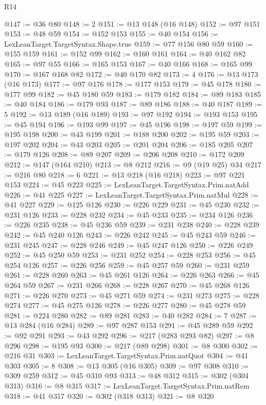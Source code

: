 \begin{lexlean}{R14}
\begin{coremodule}
@147 := @36 @80
@148 := 2
@151 := @13 @148 (@16 @148)
@152 := @97 @151
@153 := @48 @59
@154 := @152 @153
@155 := @40 @154
@156 := LexLeanTarget.TargetSyntax.Shape.true
@159 := @77 @156 @80 @59
@160 := @155 @159
@161 := @152 @99
@162 := @160 @161
@164 := @40 @162 @82
@165 := @97 @55
@166 := @165 @153
@167 := @40 @166
@168 := @165 @99
@170 := @167 @168 @82
@172 := @40 @170 @82
@173 := 4
@176 := @13 @173 (@16 @173)
@177 := @97 @176
@178 := @177 @153
@179 := @45 @178
@180 := @177 @99
@182 := @45 @180 @59
@183 := @179 @182
@184 := @89 @183
@185 := @40 @184
@186 := @179 @93
@187 := @89 @186
@188 := @40 @187
@189 := 5
@192 := @13 @189 (@16 @189)
@193 := @97 @192
@194 := @193 @153
@195 := @45 @194
@196 := @193 @99
@197 := @45 @196
@198 := @197 @59
@199 := @195 @198
@200 := @43 @199
@201 := @188 @200
@202 := @195 @59
@203 := @197 @202
@204 := @43 @203
@205 := @201 @204
@206 := @185 @205
@207 := @179 @126
@208 := @89 @207
@209 := @206 @208
@210 := @172 @209
@212 := @147 (@164 @210)
@213 := @8 @212
@216 := @9 (@19 @25) @34
@217 := @216 @80
@218 := 6
@221 := @13 @218 (@16 @218)
@223 := @97 @221 @153
@224 := @45 @223
@225 := LexLeanTarget.TargetSyntax.Prim.natAdd
@226 := @41 @225
@227 := LexLeanTarget.TargetSyntax.Prim.natMul
@228 := @41 @227
@229 := @125 @126
@230 := @226 @229
@231 := @45 @230
@232 := @231 @126
@233 := @228 @232
@234 := @45 @233
@235 := @234 @126
@236 := @226 @235
@238 := @45 @236 @59
@239 := @231 @238
@240 := @228 @239
@242 := @45 @240 @126
@243 := @226 @242
@245 := @45 @243 @59
@246 := @231 @245
@247 := @228 @246
@249 := @45 @247 @126
@250 := @226 @249
@252 := @45 @250 @59
@253 := @231 @252
@254 := @228 @253
@256 := @45 @254 @126
@257 := @226 @256
@259 := @45 @257 @59
@260 := @231 @259
@261 := @228 @260
@263 := @45 @261 @126
@264 := @226 @263
@266 := @45 @264 @59
@267 := @231 @266
@268 := @228 @267
@270 := @45 @268 @126
@271 := @226 @270
@273 := @45 @271 @59
@274 := @231 @273
@275 := @228 @274
@277 := @45 @275 @126
@278 := @226 @277
@280 := @45 @278 @59
@281 := @224 @280
@282 := @89 @281
@283 := @40 @282
@284 := 7
@287 := @13 @284 (@16 @284)
@289 := @97 @287 @153
@291 := @45 @289 @59
@292 := @92 @291
@293 := @43 @292
@296 := @217 (@283 @293 @82)
@297 := @8 @296
@298 := @195 @93
@300 := @217 (@89 @298)
@301 := @8 @300
@302 := @216 @31
@303 := LexLeanTarget.TargetSyntax.Prim.natQuot
@304 := @41 @303
@305 := 8
@308 := @13 @305 (@16 @305)
@309 := @97 @308
@310 := @309 @259
@312 := @45 @310 @93
@313 := @48 @312
@315 := @302 (@304 @313)
@316 := @8 @315
@317 := LexLeanTarget.TargetSyntax.Prim.natRem
@318 := @41 @317
@320 := @302 (@318 @313)
@321 := @8 @320

\end{coremodule}
\end{lexlean}
